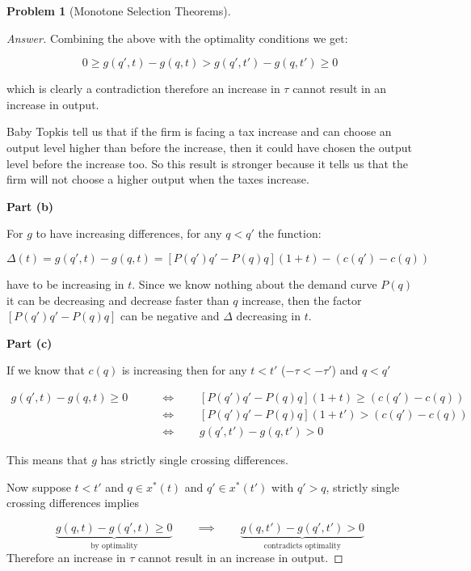 \documentclass{article}
\theoremstyle{definition}
\newtheorem{problem}{Problem}
\newcommand{\qiq}{\qquad \implies \qquad}
\newcommand{\qiffq}{\qquad \iff \qquad}
\begin{document}
\begin{problem}[Monotone Selection Theorems]
\begin{proof}[Answer]
Combining the above with the optimality conditions we get:

$$0\geq g(q',t)-g(q,t)>g(q',t')-g(q,t')\geq0$$

which is clearly a contradiction therefore an increase in $\tau$ cannot result in an increase in output.

Baby Topkis tell us that if the firm is facing a tax increase and can choose an output level higher than before the increase, then it could have chosen the output level before the increase too. So this result is stronger because it tells us that the firm will not choose a higher output when the taxes increase.

\textbf{Part (b)}

For $g$ to have increasing differences, for any $q<q'$ the function:

$$\Delta(t) = g(q', t) - g(q, t) = [P(q')q'-P(q)q](1+t)-(c(q')-c(q))$$

have to be increasing in $t$. Since we know nothing about the demand curve $P(q)$ it can be decreasing and decrease faster than $q$ increase, then the factor $[P(q')q'-P(q)q]$ can be negative and $\Delta$ decreasing in $t$.

\textbf{Part (c)}

If we know that $c(q)$ is increasing then for any $t<t'$ ($-\tau<-\tau'$) and $q<q'$

\begin{align*}
    g(q',t)-g(q,t)\geq 0 &\qiffq [P(q')q'-P(q)q](1+t)\geq(c(q')-c(q))\\
    &\qiffq [P(q')q'-P(q)q](1+t')>(c(q')-c(q)) \\ &\qiffq g(q',t')-g(q,t')> 0
\end{align*}

This means that $g$ has strictly single crossing differences.

Now suppose $t<t'$ and $q\in x^*(t)$ and $q'\in x^*(t')$ with $q'>q$, strictly single crossing differences implies 

$$\underbrace{g(q, t)-g(q',t)\geq 0} _{\text{by optimality}}\qiq \underbrace{g(q, t')-g(q',t') > 0}_{\text{contradicts optimality}}$$
Therefore an increase in $\tau$ cannot result in an increase in output.
\end{proof}

\end{problem}
\end{document}
